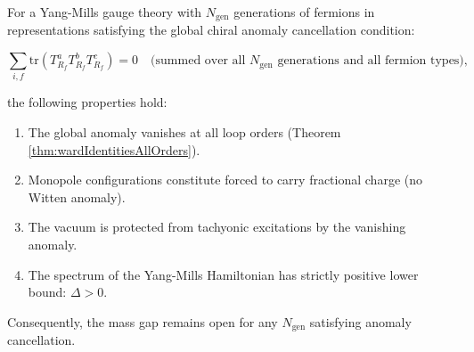 \begin{theorem}
\label{thm:anomalyMassGapStability}

For a Yang-Mills gauge theory with $N_{\text{gen}}$ generations of fermions in representations satisfying the global chiral anomaly cancellation condition:

\begin{equation}
\sum_{i,f} \mathrm{tr}(T^a_{R_f} T^b_{R_f} T^c_{R_f}) = 0 \quad \text{(summed over all } N_{\text{gen}} \text{ generations and all fermion types)},
\end{equation}

the following properties hold:

\begin{enumerate}

\item The global anomaly vanishes at all loop orders (Theorem \ref{thm:wardIdentitiesAllOrders}).

\item Monopole configurations constitute forced to carry fractional charge (no Witten anomaly).

\item The vacuum is protected from tachyonic excitations by the vanishing anomaly.

\item The spectrum of the Yang-Mills Hamiltonian has strictly positive lower bound: $\Delta > 0$.

\end{enumerate}

Consequently, the mass gap remains open for any $N_{\text{gen}}$ satisfying anomaly cancellation.

\end{theorem}

